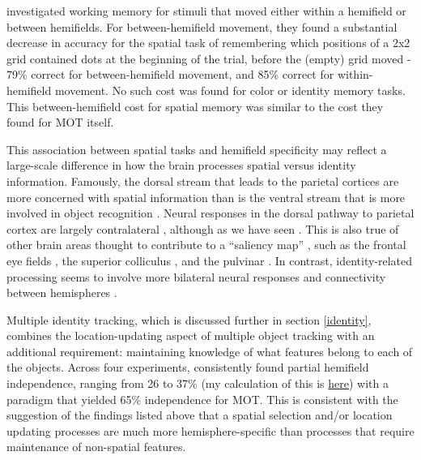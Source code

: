 \documentclass[
]{book}
\begin{document}
\citet{strongHemifieldspecificControlSpatial2020} investigated working memory for stimuli that moved either within a hemifield or between hemifields. For between-hemifield movement, they found a substantial decrease in accuracy for the spatial task of remembering which positions of a 2x2 grid contained dots at the beginning of the trial, before the (empty) grid moved - 79\% correct for between-hemifield movement, and 85\% correct for within-hemifield movement. No such cost was found for color or identity memory tasks. This between-hemifield cost for spatial memory was similar to the cost they found for MOT itself.

This association between spatial tasks and hemifield specificity may reflect a large-scale difference in how the brain processes spatial versus identity information. Famously, the dorsal stream that leads to the parietal cortices are more concerned with spatial information than is the ventral stream that is more involved in object recognition \citep{goodaleSeparateVisualPathways1992}. Neural responses in the dorsal pathway to parietal cortex are largely contralateral \citep{serenoMappingContralateralSpace2001}, although as we have seen . This is also true of other brain areas thought to contribute to a ``saliency map'' \citep{fecteauSalienceRelevanceFiring2006}, such as the frontal eye fields \citep{haglerjrSpatialMapsFrontal2006}, the superior colliculus \citep{schneiderVisualResponsesHuman2005}, and the pulvinar \citep{cottonContralateralVisualHemifield2007a}. In contrast, identity-related processing seems to involve more bilateral neural responses and connectivity between hemispheres \citep{cohenUsingNeuronalPopulations2011, hemondPreferenceContralateralStimuli2007}.

Multiple identity tracking, which is discussed further in section \ref{identity}, combines the location-updating aspect of multiple object tracking with an additional requirement: maintaining knowledge of what features belong to each of the objects. Across four experiments, \citet{hudsonHemifieldEffectsMultiple2012} consistently found partial hemifield independence, ranging from 26 to 37\% (my calculation of this is \href{https://github.com/alexholcombe/tracking-review/blob/main/twoBrainsOrOne.Rmd}{here}) with a paradigm that yielded 65\% independence for MOT. This is consistent with the suggestion of the findings listed above that a spatial selection and/or location updating processes are much more hemisphere-specific than processes that require maintenance of non-spatial features.
\end{document}
